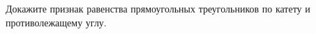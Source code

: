 \begin{ex}
	\begin{condition}
		Докажите признак равенства прямоугольных треугольников по катету и противолежащему углу.
	\end{condition}
\end{ex}